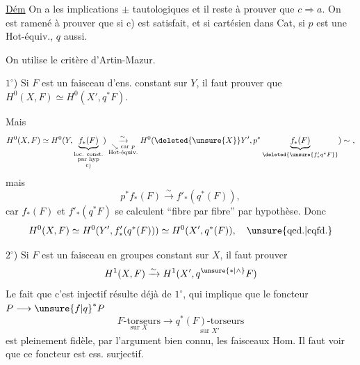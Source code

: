 \uline{Dém} On a les implications $\pm$ tautologiques
et il reste à prouver que $c\Longrightarrow a$.
On est ramené à prouver que si c) est satisfait, et si
cartésien dans Cat, si $p$ est une Hot-équiv., $q$ aussi.

On utilise le critère d'Artin-Mazur.

$1^\circ$) Si $F$ est un faisceau d'ens.  constant sur $Y$,
il faut prouver que $H^0(X,F)\simeq H^0(X',q^*F)$.


Mais
\[
H^0(X,F)\simeq H^0(Y,\underbrace{f_*(F)}_{\substack{\text{loc. const.}\\\text{par hyp}\\\text{c)}}})
\underset{\substack{\searrow\ \text{car }p\\\text{Hot-équiv.}}}{\xrightarrow{\sim}}
H^0(\deleted{\unsure{X}}Y',p^*\underbrace{f_*(F)}_{\deleted{\unsure{f'_*q^*F}}})\sim\ ,
\]
mais
\[
p^*f_*(F)\xrightarrow{\sim} f'_*(q^*(F)),
\]
car $f_*(F)$ et $f'_*(q^*F)$ se calculent ``fibre par
fibre'' par hypothèse. Donc
\[
H^0(X,F)\simeq H^0(Y',f'_*(q^*(F)))\simeq H^0(X',q^*(F)),\quad\text{\unsure{qed.|cqfd.}}
\]

$2^\circ$) Si $F$ est un faisceau en groupes  constant sur $X$,
il faut prouver
\[
H^1(X,F)\xrightarrow{\sim}H^1(X',q^{\unsure{*|\wedge}}F)
\]
Le fait que c'est injectif résulte déjà de $1^\circ$,
qui implique que le foncteur $P\longrightarrow \unsure{f|q}^*P$
\[
\underset{\text{sur }X}{F\text{-torseurs}}\longrightarrow
\underset{\text{sur }X'}{q^*(F)\text{-torseurs}}
\]
est pleinement fidèle, par l'argument bien
connu,  les faisceaux $\mathrm{Hom}$. Il
faut voir que ce foncteur est ess. surjectif.

